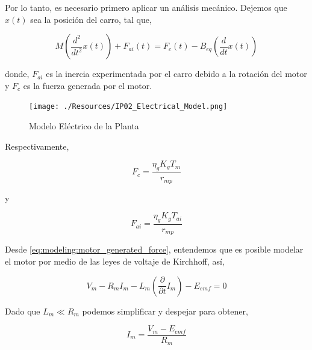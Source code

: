 \documentclass[12pt,a4paper]{article}
\begin{document}
        Por lo tanto, es necesario primero aplicar un análisis mecánico. Dejemos que \( x\left(t\right) \) sea la 
        posición del carro, tal que, 

        \begin{equation}
          M \left(\dfrac{d^{2}}{dt^{2}}x\left(t\right)\right) + F_{ai}\left(t\right) = 
          F_{c} \left(t\right) - B_{eq}\left(\dfrac{d}{dt}x \left(t\right)\right)
          \label{eq:modeling:initial_dynamic}
        \end{equation}

        donde, \( F_{ai} \) es la inercia experimentada por el carro debido a la rotación del motor y \( F_{c}\) es 
        la fuerza generada por el motor.

        \begin{figure}[h]
          \centering
          \texttt{[image: ./Resources/IP02\_Electrical\_Model.png]}
          \caption{Modelo Eléctrico de la Planta}
          \label{fig:modeling:plant_electrical_map}
        \end{figure}

        Respectivamente, 

        \begin{equation}
          F_{c} = \dfrac{\eta_{g} K_{g} T_{m}}{r_{mp}}
          \label{eq:modeling:motor_generated_force}
        \end{equation}

        y
        
        \begin{equation}
          F_{ai} = \dfrac{\eta_{g} K_{g} T_{ai}}{r_{mp}}
          \label{eq:modeling:armature_inertial_force}
        \end{equation}

        Desde \ref{eq:modeling:motor_generated_force}, entendemos que es posible modelar el motor 
        por medio de las leyes de voltaje de Kirchhoff, así, 

        \begin{equation}
          V_{m} - R_{m} I_{m} - L_{m} \left(\dfrac{\partial}{\partial t} I_{m}\right) - E_{emf} = 0
          \label{eq:modeling:kirchhoff_kvl}
        \end{equation}

        Dado que \( L_{m} \ll R_{m} \) podemos simplificar y despejar para obtener, 

        \begin{equation}
          I_{m} = \dfrac{V_{m} - E_{emf}}{R_{m}}
          \label{eq:modeling:current_kvl}
        \end{equation}
        
\end{document}
